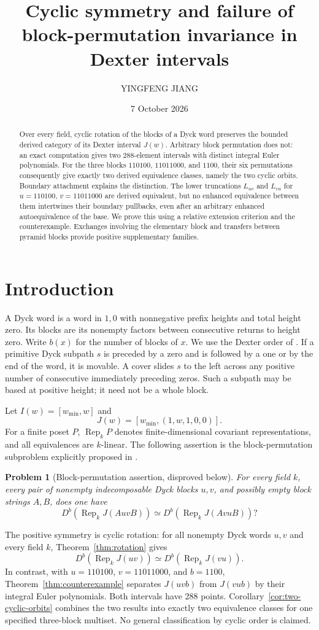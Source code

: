 \documentclass[11pt]{article}
\title{Cyclic symmetry and failure of block-permutation invariance in Dexter intervals}
\author{YINGFENG JIANG}
\date{7 October 2026}
\newtheorem{problem}[theorem]{Problem}
\theoremstyle{definition}
\newcommand{\Rep}{\operatorname{Rep}}
\newcommand{\Db}{D^b}
\begin{document}
\maketitle
\begin{abstract}
Over every field, cyclic rotation of the blocks of a Dyck word
preserves the bounded derived category of its Dexter interval $J(w)$.
Arbitrary block permutation does not: an exact computation gives
two 288-element intervals with distinct integral Euler polynomials.
For the three blocks $110100$, $11011000$, and $1100$, their six
permutations consequently give exactly two derived equivalence classes,
namely the two cyclic orbits. Boundary attachment explains the distinction.
The lower truncations $L_{uv}$ and $L_{vu}$ for
$u=110100$, $v=11011000$ are derived equivalent, but no enhanced
equivalence between them intertwines their
boundary pullbacks, even after an arbitrary enhanced autoequivalence
of the base. We prove this using a relative extension criterion and
the counterexample. Exchanges involving the elementary block and
transfers between pyramid blocks provide positive supplementary families.
\end{abstract}

\section{Introduction}
\label{sec:introduction}
A Dyck word is a word in $1,0$ with nonnegative prefix heights and total
height zero. Its blocks are its nonempty factors between consecutive
returns to height zero. Write $b(x)$ for the number of blocks of $x$.
We use the Dexter order of \cite{Chapoton}. If a primitive Dyck subpath
$s$ is preceded by a zero and is followed by a one or by the end of
the word, it is movable. A cover slides $s$ to the left across any
positive number of consecutive immediately preceding zeros. Such a
subpath may be based at positive height; it need not be a whole block.

Let $I(w)=[w_{\min},w]$ and
\[
 J(w)=[w_{\min},(1,w,1,0,0)].
\]
For a finite poset $P$, $\Rep_k P$ denotes finite-dimensional covariant
representations, and all equivalences are $k$-linear. The following
assertion is the block-permutation subproblem explicitly proposed in
\cite[Section 9, Conjecture 9.1]{Chapoton}.
\begin{problem}[Block-permutation assertion, disproved below]\label{prob:swap}
For every field $k$, every pair of nonempty indecomposable Dyck blocks
$u,v$, and possibly empty block strings $A,B$, does one have
\[
 \Db(\Rep_k J(AuvB))\simeq\Db(\Rep_k J(AvuB))?
\]
\end{problem}
The positive symmetry is cyclic rotation: for all nonempty Dyck words
$u,v$ and every field $k$, Theorem~\ref{thm:rotation} gives
\[
 \Db(\Rep_k J(uv))\simeq\Db(\Rep_k J(vu)).
\]
In contrast, with $u=110100$, $v=11011000$, and $b=1100$,
Theorem~\ref{thm:counterexample} separates $J(uvb)$ from $J(vub)$
by their integral Euler polynomials. Both intervals have 288 points.
Corollary~\ref{cor:two-cyclic-orbits} combines the
two results into exactly two equivalence classes for one specified
three-block multiset. No general classification by cyclic order is claimed.
\end{document}
